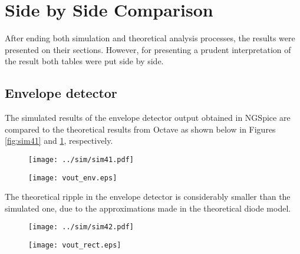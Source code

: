 \section{Side by Side Comparison}
\label{sec:comparison}

After ending both simulation and theoretical analysis processes, the results were presented on their sections. However, for presenting a prudent interpretation of the result both tables were put side by side.

\subsection{Envelope detector}

The simulated results of the envelope detector output obtained in NGSpice are compared to the theoretical results from Octave as shown below in Figures \ref{fig:sim41} and \ref{fig:vout_env}, respectively.

\begin{figure} [ht]
\centering
\begin{minipage}{.5\textwidth}
  \centering
  \texttt{[image: ../sim/sim41.pdf]}
  \label{fig:sim41}
\end{minipage}%
\begin{minipage}{.5\textwidth}
  \centering
  \texttt{[image: vout\_env.eps]}
  \label{fig:vout_env}
\end{minipage}
\end{figure}

The theoretical ripple in the envelope detector is considerably smaller than the simulated one, due to the approximations made in the theoretical diode model.

\begin{figure}
\centering
\begin{minipage}{.5\textwidth}
  \centering
  \texttt{[image: ../sim/sim42.pdf]}
  \label{fig:sim_error}
\end{minipage}%
\begin{minipage}{.5\textwidth}
  \centering
  \texttt{[image: vout\_rect.eps]}
  \label{fig:theo_error}
\end{minipage}
\end{figure}

